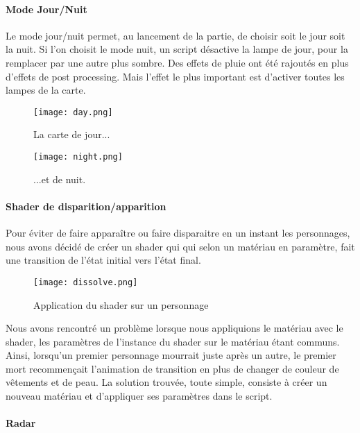         \paragraph{Mode Jour/Nuit}
        Le mode jour/nuit permet, au lancement de la partie,
        de choisir soit le jour soit la nuit. Si l'on choisit le mode nuit, un script désactive la lampe de jour,
        pour la remplacer par une autre plus sombre. Des effets de pluie ont été rajoutés en plus d'effets de post processing.
        Mais l'effet le plus important est d'activer toutes les lampes de la carte.
        \begin{figure}[hbt!]
            \centering
            \texttt{[image: day.png]}
            \caption{La carte de jour...}
        \end{figure}
        \begin{figure}[hbt!]
            \centering

            \texttt{[image: night.png]}
            \caption{...et de nuit.}

        \end{figure}
        \FloatBarrier

        \paragraph{Shader de disparition/apparition}
        Pour éviter de faire apparaître ou faire disparaitre en un instant les personnages, nous avons décidé de créer un shader qui qui selon un matériau en paramètre, 
        fait une transition de l'état initial vers l'état final. 
        \begin{figure}[hbt!]
            \centering
            \texttt{[image: dissolve.png]}
            \caption{Application du shader sur un personnage}

        \end{figure}
        \FloatBarrier

        Nous avons rencontré un problème lorsque nous appliquions le matériau avec le shader,
        les paramètres de l'instance du shader sur le matériau étant communs. Ainsi, lorsqu'un premier personnage mourrait juste après un autre, 
        le premier mort recommençait l'animation de transition en plus de changer de couleur de vêtements et de peau.
        La solution trouvée, toute simple, consiste à créer un nouveau matériau et d'appliquer  ses paramètres dans le script.


        \paragraph{Radar}

